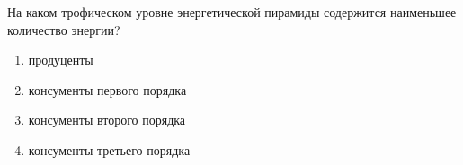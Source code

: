
На каком трофическом уровне энергетической пирамиды содержится наименьшее количество энергии?

\begin{enumerate}
    \item продуценты
    \item консументы первого порядка 
    \item консументы второго порядка
    \item консументы третьего порядка
\end{enumerate}



